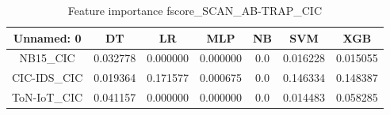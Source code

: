 \begin{table}[H]
\centering
\caption{Feature importance fscore_SCAN_AB-TRAP_CIC}
\label{fscore_SCAN_AB-TRAP_CIC}
\begin{tabular}{ccccccc}
\toprule
 Unnamed: 0 &       DT &       LR &      MLP &  NB &      SVM &      XGB \\
\midrule
   NB15\_CIC & 0.032778 & 0.000000 & 0.000000 & 0.0 & 0.016228 & 0.015055 \\
CIC-IDS\_CIC & 0.019364 & 0.171577 & 0.000675 & 0.0 & 0.146334 & 0.148387 \\
ToN-IoT\_CIC & 0.041157 & 0.000000 & 0.000000 & 0.0 & 0.014483 & 0.058285 \\
\bottomrule
\end{tabular}
\end{table}
